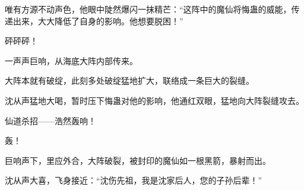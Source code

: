 \begin{this_body}
唯有方源不动声色，他眼中陡然爆闪一抹精芒：“这阵中的魔仙将悔蛊的威能，传递出来，大大降低了自身的影响。他想要脱困！”

砰砰砰！

一声声巨响，从海底大阵内部传来。

大阵本就有破绽，此刻多处破绽猛地扩大，联络成一条巨大的裂缝。

沈从声猛地大喝，暂时压下悔蛊对他的影响，他通红双眼，猛地向大阵裂缝攻去。

仙道杀招——浩然轰响！

轰！

巨响声下，里应外合，大阵破裂，被封印的魔仙如一根黑箭，暴射而出。

沈从声大喜，飞身接近：“沈伤先祖，我是沈家后人，您的子孙后辈！”

\end{this_body}

